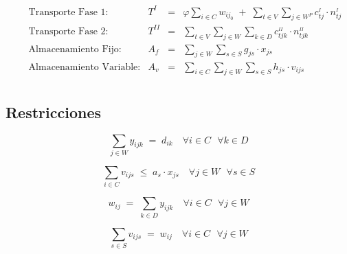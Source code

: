 \documentclass[fleqn, 11pt,letterpaper]{article}
\begin{document}
\begin{math}
    \begin{array}{llll}
        \qquad \mbox{Transporte Fase 1}: & \! \! T^{I} & \! \!=\! \! &
            \varphi \sum\limits_{i \in C} w_{ij_0}
            \; + \;
            \sum\limits_{t \in V}
            \sum\limits_{j \in W^{P}}
                c^{_I}_{tj} \!\cdot n^{_I}_{tj}\\[5mm]
        \qquad \mbox{Transporte Fase 2}: & \! \! T^{II} & \! \!=\! \! &
            \sum\limits_{t \in V}
            \sum\limits_{j \in W}
            \sum\limits_{k \in D}
                c^{_{II}}_{tjk} \!\cdot n^{_{II}}_{tjk}\\[5mm]
         \qquad \mbox{Almacenamiento Fijo}: & \! \!   A_{f} & \! \!=\! \! &
        \sum\limits_{j \in W}
        \sum\limits_{s \in S}
            g_{js} \cdot x_{js} \\[5mm]
        \qquad \mbox{Almacenamiento Variable}: & \! \!   A_{v} & \! \!=\! \! &
        \sum\limits_{i \in C}
        \sum\limits_{j \in W}
        \sum\limits_{s \in S}
            h_{js} \cdot v_{ijs} \\[5mm]
    \end{array}
\end{math}

\subsection*{Restricciones}
\vspace{2em}

\begin{equation}
    \label{eq:demanda}
    \sum\limits_{j \in W} y_{ijk} \; = \; d_{ik} \quad
        \forall i \in C\:\:\:
        \forall k \in D
\end{equation}

\begin{equation}
    \label{eq:capacidad}
    \sum\limits_{i \in C} v_{ijs} \; \leq \; a_s \!\cdot x_{js} \quad
        \forall j \in W\:\:\:
        \forall s \in S
\end{equation}

\begin{equation}
    \label{eq:balance1}
    w_{ij} \; = \; \sum\limits_{k \in D} y_{ijk} \quad
        \forall i \in C\:\:\:
        \forall j \in W
\end{equation}

\begin{equation}
    \label{eq:balance2}
    \sum\limits_{s \in \mathit{S}} v_{ijs} \; = \; w_{ij} \quad
        \forall i \in \mathit{C}\:\:\:
        \forall j \in \mathit{W}
\end{equation}
\end{document}
